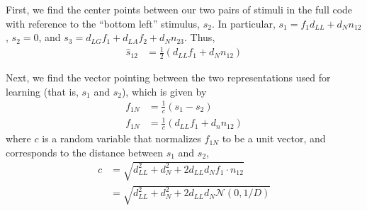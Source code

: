 \documentclass[letter,12pt]{article}
\newcommand{\dll}{d_{LL}}
\newcommand{\dlg}{d_{LG}}
\newcommand{\dla}{d_{LA}}
\newcommand{\dn}{d_{N}}
\newcommand{\dis}{\mathcal{N}(0, 1/D)}
\begin{document}
First, we find the center points between our two pairs of stimuli in the full
code with reference to the ``bottom left'' stimulus, $s_{2}$. In particular,
$s_{1} = f_{1} \dll + \dn n_{12}$, $s_{2} = 0$, and
$s_{3} = \dlg f_{1} + \dla f_{2} + \dn n_{23}$. Thus, 
\begin{align}
  \hat{s}_{12} &= \frac{1}{2}\left(\dll f_{1} + \dn n_{12}\right)
\end{align}

Next, we find the vector pointing between the two representations used for
learning (that is, $s_{1}$ and $s_{2}$), which is given by
\begin{align}
  f_{1N} &= \frac{1}{c}\left(s_{1} - s_{2}\right) \\
  f_{1N} &= \frac{1}{c}\left(\dll f_{1} + d_{n}n_{12}\right)
\end{align}
where $c$ is a random variable that normalizes $f_{1N}$ to be a unit
vector, and corresponds to the distance between $s_{1}$ and $s_{2}$,
\begin{align}
  c &= \sqrt{\dll^{2} + \dn^{2} + 2 \dll \dn f_{1} \cdot n_{12}} \\
  &= \sqrt{\dll^{2} + \dn^{2} + 2 \dll \dn \dis} 
\end{align}
\end{document}
